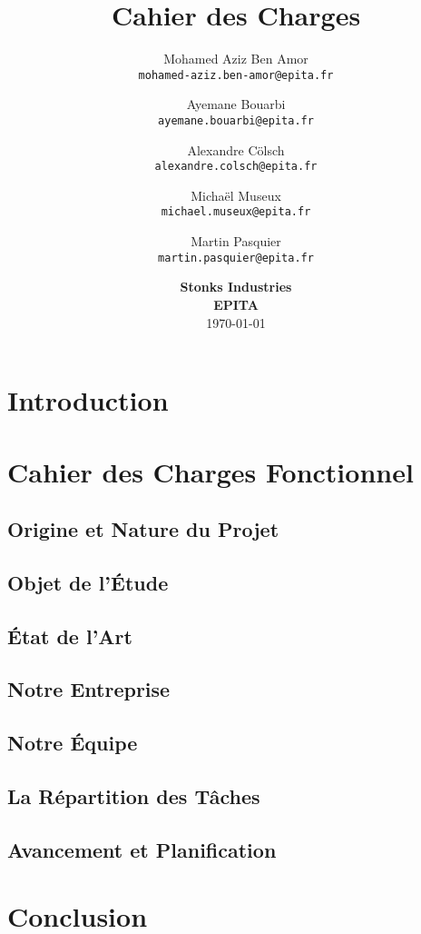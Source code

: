 \documentclass[11pt]{article}
\title{
    Cahier des Charges \\
    \textbf{\gameName}
    \vspace{6cm}
}
\author{
    Mohamed Aziz Ben Amor \\
    \texttt{mohamed-aziz.ben-amor@epita.fr}
    \vspace{0.5cm}\and
    Ayemane Bouarbi \\
    \texttt{ayemane.bouarbi@epita.fr}
    \vspace{0.5cm}\and
    Alexandre Cölsch \\
    \texttt{alexandre.colsch@epita.fr}
    \vspace{0.5cm}\and
    Michaël Museux \\
    \texttt{michael.museux@epita.fr}
    \vspace{0.5cm}\and
    Martin Pasquier \\
    \texttt{martin.pasquier@epita.fr}
}
\date{
    \vspace{1.5cm}
    \textbf{Stonks Industries} \\
    \vspace{0.3cm}
    \textbf{EPITA} \\
    \vspace{1.5cm}
    \today
}
\begin{document}
\begin{titlepage}
    \maketitle
    \thispagestyle{empty} %
\end{titlepage}

\newpage
\thispagestyle{empty}
\mbox{}

\newpage
\tableofcontents

\newpage
\section{Introduction}





\newpage
\section{Cahier des Charges Fonctionnel}

\subsection{Origine et Nature du Projet}



\subsection{Objet de l'\'Etude}



\subsection{\'Etat de l'Art}



\subsection{Notre Entreprise}



\subsection{Notre \'Equipe}



\subsection{La Répartition des Tâches}



\subsection{Avancement et Planification}






\newpage
\section{Conclusion}


\end{document}
